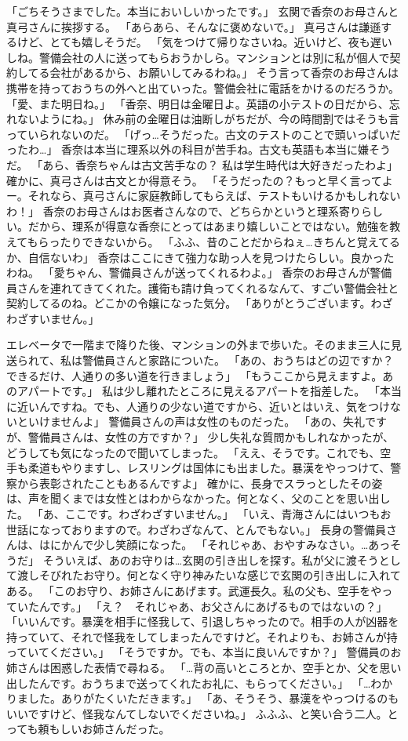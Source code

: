 「ごちそうさまでした。本当においしいかったです。」
玄関で香奈のお母さんと真弓さんに挨拶する。
「あらあら、そんなに褒めないで。」
真弓さんは謙遜するけど、とても嬉しそうだ。
「気をつけて帰りなさいね。近いけど、夜も遅いしね。警備会社の人に送ってもらおうかしら。マンションとは別に私が個人で契約してる会社があるから、お願いしてみるわね。」
そう言って香奈のお母さんは携帯を持っておうちの外へと出ていった。警備会社に電話をかけるのだろうか。
「愛、また明日ね。」
「香奈、明日は金曜日よ。英語の小テストの日だから、忘れないようにね。」
休み前の金曜日は油断しがちだが、今の時間割ではそうも言っていられないのだ。
「げっ…そうだった。古文のテストのことで頭いっぱいだったわ…」
香奈は本当に理系以外の科目が苦手ね。古文も英語も本当に嫌そうだ。
「あら、香奈ちゃんは古文苦手なの？ 私は学生時代は大好きだったわよ」
確かに、真弓さんは古文とか得意そう。
「そうだったの？もっと早く言ってよー。それなら、真弓さんに家庭教師してもらえば、テストもいけるかもしれないわ！」
香奈のお母さんはお医者さんなので、どちらかというと理系寄りらしい。だから、理系が得意な香奈にとってはあまり嬉しいことではない。勉強を教えてもらったりできないから。
「ふふ、昔のことだからねぇ…きちんと覚えてるか、自信ないわ」
香奈はここにきて強力な助っ人を見つけたらしい。良かったわね。
「愛ちゃん、警備員さんが送ってくれるわよ。」
香奈のお母さんが警備員さんを連れてきてくれた。護衛も請け負ってくれるなんて、すごい警備会社と契約してるのね。どこかの令嬢になった気分。
「ありがとうございます。わざわざすいません。」

エレベータで一階まで降りた後、マンションの外まで歩いた。そのまま三人に見送られて、私は警備員さんと家路についた。
「あの、おうちはどの辺ですか？できるだけ、人通りの多い道を行きましょう」
「もうここから見えますよ。あのアパートです。」
私は少し離れたところに見えるアパートを指差した。
「本当に近いんですね。でも、人通りの少ない道ですから、近いとはいえ、気をつけないといけませんよ」
警備員さんの声は女性のものだった。
「あの、失礼ですが、警備員さんは、女性の方ですか？」
少し失礼な質問かもしれなかったが、どうしても気になったので聞いてしまった。
「ええ、そうです。これでも、空手も柔道もやりますし、レスリングは国体にも出ました。暴漢をやっつけて、警察から表彰されたこともあるんですよ」
確かに、長身でスラっとしたその姿は、声を聞くまでは女性とはわからなかった。何となく、父のことを思い出した。
「あ、ここです。わざわざすいません。」
「いえ、青海さんにはいつもお世話になっておりますので。わざわざなんて、とんでもない。」
長身の警備員さんは、はにかんで少し笑顔になった。
「それじゃあ、おやすみなさい。…あっそうだ」
そういえば、あのお守りは…玄関の引き出しを探す。私が父に渡そうとして渡しそびれたお守り。何となく守り神みたいな感じで玄関の引き出しに入れてある。
「このお守り、お姉さんにあげます。武運長久。私の父も、空手をやっていたんです。」
「え？　それじゃあ、お父さんにあげるものではないの？」
「いいんです。暴漢を相手に怪我して、引退しちゃったので。相手の人が凶器を持っていて、それで怪我をしてしまったんですけど。それよりも、お姉さんが持っていてください。」
「そうですか。でも、本当に良いんですか？」
警備員のお姉さんは困惑した表情で尋ねる。
「…背の高いところとか、空手とか、父を思い出したんです。おうちまで送ってくれたお礼に、もらってください。」
「…わかりました。ありがたくいただきます。」
「あ、そうそう、暴漢をやっつけるのもいいですけど、怪我なんてしないでくださいね。」
ふふふ、と笑い合う二人。とっても頼もしいお姉さんだった。

